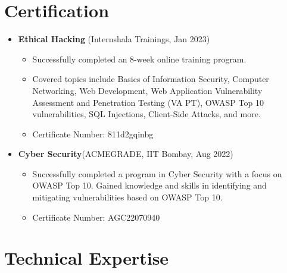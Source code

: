 \documentclass[letterpaper,10pt]{article}
\begin{document}
\begin{multicols}{2}
\section*{Certification}

\begin{itemize}
    \item \textbf{Ethical Hacking} (Internshala Trainings, Jan 2023)
        \begin{itemize}
            \item Successfully completed an 8-week online training program.
            \item Covered topics include Basics of Information Security, Computer Networking, Web Development, Web Application Vulnerability Assessment and Penetration Testing (VA PT), OWASP Top 10 vulnerabilities, SQL Injections, Client-Side Attacks, and more.
            \item Certificate Number: 811d2gqinbg
        \end{itemize}
\end{itemize}

\begin{itemize}
    \item\textbf{Cyber Security}(ACMEGRADE, IIT Bombay, Aug 2022)
        \begin{itemize}
            \item Successfully completed a program in Cyber Security with a focus on OWASP Top 10. Gained knowledge and skills in identifying and mitigating vulnerabilities based on OWASP Top 10. 
            \item Certificate Number: AGC22070940
        \end{itemize}
\end{itemize}

\section*{Technical Expertise}


\end{multicols}
\end{document}
